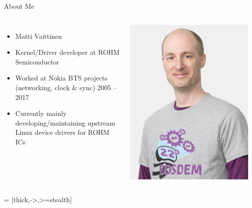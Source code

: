\documentclass[10pt]{beamer}
\begin{document}
\begin{frame}{About Me}
	\begin{columns}
		\begin{itemize}
			\item Matti Vaittinen
			\item Kernel/Driver developer at ROHM Semiconductor
			\item Worked at Nokia BTS projects (networking, clock \& sync) 2005 – 2017
			\item Currently mainly developing/maintaining upstream Linux device drivers for ROHM ICs
		\end{itemize}
		\includegraphics[width=1\linewidth]{img/me.png}
	\end{columns}
\end{frame}


 = [thick,->,>=stealth]
\end{document}
